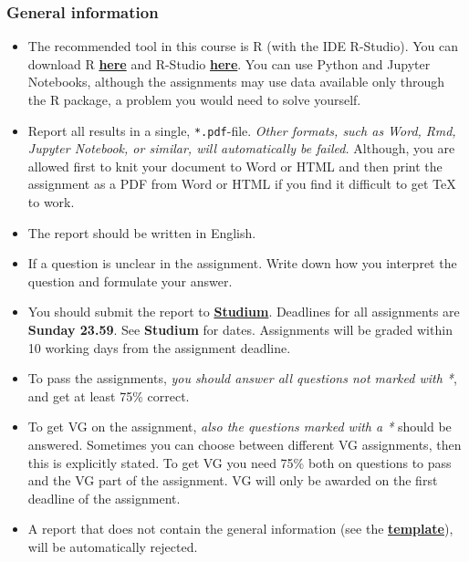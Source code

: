 
\subsubsection*{General information}

\begin{itemize}
\itemsep0em
\item The recommended tool in this course is R (with the IDE R-Studio). You can download R \href{https://cran.r-project.org/}{\textbf{here}} and R-Studio \href{https://www.rstudio.com/products/rstudio/download/}{\textbf{here}}. You can use Python and Jupyter Notebooks, although the assignments may use data available only through the R package, a problem you would need to solve yourself.

\item  Report all results in a single, \texttt{*.pdf}-file. \emph{Other formats, such as Word, Rmd, Jupyter Notebook, or similar, will automatically be failed.} Although, you are allowed first to knit your document to Word or HTML and then print the assignment as a PDF from Word or HTML if you find it difficult to get TeX to work.

\item The report should be written in English.

\item If a question is unclear in the assignment. Write down how you interpret the question and formulate your answer.

\item You should submit the report to \href{https://studium.uu.se/}{\textbf{Studium}}. Deadlines for all assignments are \textbf{Sunday 23.59}. See \textbf{Studium} for dates. Assignments will be graded within 10 working days from the assignment deadline.

\item To pass the assignments, \emph{you should answer all questions not marked with *}, and get at least 75\% correct.

\item To get VG on the assignment, \emph{also the questions marked with a *} should be answered. Sometimes you can choose between different VG assignments, then this is explicitly stated. To get VG you need 75\% both on questions to pass and the VG part of the assignment. VG will only be awarded on the first deadline of the assignment.

\item A report that does not contain the general information (see the \href{https://raw.githubusercontent.com/MansMeg/IntroML/master/templates/assignment_template.pdf}{\textbf{template}}), will be automatically rejected.


\end{itemize}
